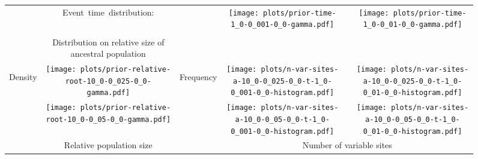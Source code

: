 \documentclass[border=10pt,varwidth=30cm]{standalone}
\begin{document}
\begin{figure}
    \centering
    \begin{tabular}{@{}cccccc@{}}
        & \multirow{1}{0.15\textwidth}[8em]{\centering\Large Event~time~distribution:}
        &
        & \multicolumn{1}{c}{\texttt{[image: plots/prior-time-1\_0-0\_001-0\_0-gamma.pdf]}}
        &
        & \multicolumn{1}{c}{\texttt{[image: plots/prior-time-1\_0-0\_01-0\_0-gamma.pdf]}} \\
        \cline{1-2}\cline{4-4}\cline{6-6}
        & & & & & \\
        & \multirow{1}{0.15\textwidth}{\centering\Large Distribution on relative size of ancestral population}
        &
        &
        &
        & \\[9ex]
        \multirow{2}{*}[1em]{\begin{sideways}\large Density\end{sideways}}
        & \texttt{[image: plots/prior-relative-root-10\_0-0\_025-0\_0-gamma.pdf]}
        & \multirow{2}{*}[2em]{\begin{sideways}\large Frequency\end{sideways}}
        & \texttt{[image: plots/n-var-sites-a-10\_0-0\_025-0\_0-t-1\_0-0\_001-0\_0-histogram.pdf]}
        &
        & \texttt{[image: plots/n-var-sites-a-10\_0-0\_025-0\_0-t-1\_0-0\_01-0\_0-histogram.pdf]} \\
        & \texttt{[image: plots/prior-relative-root-10\_0-0\_05-0\_0-gamma.pdf]}
        &
        & \texttt{[image: plots/n-var-sites-a-10\_0-0\_05-0\_0-t-1\_0-0\_001-0\_0-histogram.pdf]}
        &
        & \texttt{[image: plots/n-var-sites-a-10\_0-0\_05-0\_0-t-1\_0-0\_01-0\_0-histogram.pdf]} \\
        & \multirow{1}{0.15\textwidth}{\centering\large Relative population size}
        &
        & \multicolumn{3}{c}{\large Number of variable sites} \\
    \end{tabular}
\end{figure}
\end{document}
